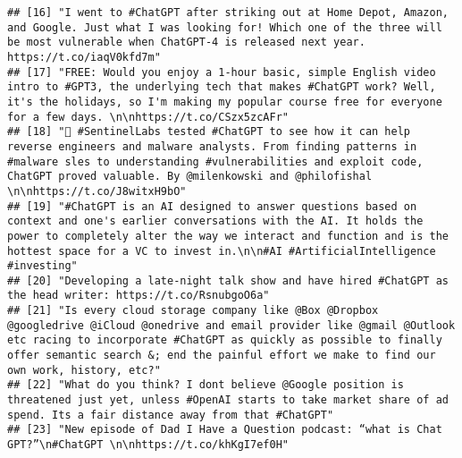 \documentclass[
]{article}
\begin{document}
\begin{verbatim}
## [16] "I went to #ChatGPT after striking out at Home Depot, Amazon, and Google. Just what I was looking for! Which one of the three will be most vulnerable when ChatGPT-4 is released next year. https://t.co/iaqV0kfd7m"                                                                                                             
## [17] "FREE: Would you enjoy a 1-hour basic, simple English video intro to #GPT3, the underlying tech that makes #ChatGPT work? Well, it's the holidays, so I'm making my popular course free for everyone for a few days. \n\nhttps://t.co/CSzx5zcAFr"                                                                                
## [18] "🤖 #SentinelLabs tested #ChatGPT to see how it can help reverse engineers and malware analysts. From finding patterns in #malware sles to understanding #vulnerabilities and exploit code, ChatGPT proved valuable. By @milenkowski and @philofishal \n\nhttps://t.co/J8witxH9bO"                                               
## [19] "#ChatGPT is an AI designed to answer questions based on context and one's earlier conversations with the AI. It holds the power to completely alter the way we interact and function and is the hottest space for a VC to invest in.\n\n#AI #ArtificialIntelligence #investing"                                                 
## [20] "Developing a late-night talk show and have hired #ChatGPT as the head writer: https://t.co/RsnubgoO6a"                                                                                                                                                                                                                          
## [21] "Is every cloud storage company like @Box @Dropbox @googledrive @iCloud @onedrive and email provider like @gmail @Outlook etc racing to incorporate #ChatGPT as quickly as possible to finally offer semantic search &; end the painful effort we make to find our own work, history, etc?"                                      
## [22] "What do you think? I dont believe @Google position is threatened just yet, unless #OpenAI starts to take market share of ad spend. Its a fair distance away from that #ChatGPT"                                                                                                                                                 
## [23] "New episode of Dad I Have a Question podcast: “what is Chat GPT?”\n#ChatGPT \n\nhttps://t.co/khKgI7ef0H"                                                                                                                                                                                                                        

\end{verbatim}
\end{document}
